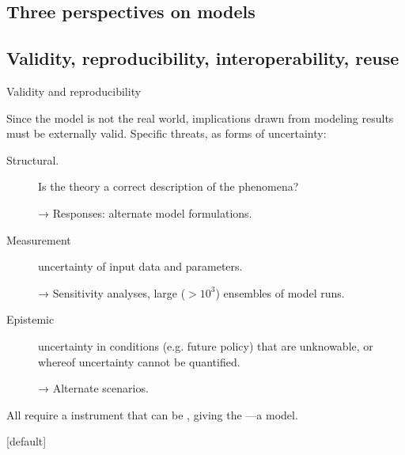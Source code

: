 \documentclass[12pt,aspectratio=169]{beamer}
\begin{document}



\subsection{Three perspectives on models}


\subsection{Validity, reproducibility, interoperability, reuse}
\begin{frame}{Validity and reproducibility}

Since the model is not the real world, implications drawn from modeling results must be externally valid.
Specific threats, as forms of uncertainty:

\begin{description}
  \item [Structural.] Is the theory a correct description of the phenomena?

    → Responses: alternate model formulations.

  \item [Measurement] uncertainty of input data and parameters.

    → Sensitivity analyses, large ($>10^3$) ensembles of model runs.

  \item [Epistemic] uncertainty in conditions (e.g. future policy) that are unknowable, or whereof uncertainty cannot be quantified.

    → Alternate scenarios.
\end{description}

All require a  instrument that can be , giving the —a  model.
\end{frame}

{
  [default]
  
}
\end{document}
